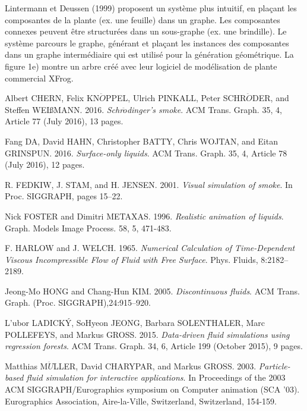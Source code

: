 \documentclass[11pt]{article}
\begin{document}
Lintermann et Deussen (1999) proposent un système plus intuitif, en plaçant les composantes de la plante (ex. une feuille) dans un graphe. Les composantes connexes peuvent être structurées dans un sous-graphe (ex. une brindille). Le système parcours le graphe, générant et plaçant les instances des composantes dans un graphe intermédiaire qui est utilisé pour la génération géométrique. La figure 1e) montre un arbre créé avec leur logiciel de modélisation de plante commercial XFrog.\newline


\newpage
\begin{thebibliography}{2} 

Albert CHERN, Felix KN$\ddot{O}$PPEL, Ulrich PINKALL, Peter SCHR$\ddot{O}$DER, and Steffen WEIßMANN. 2016.
\textit{Schr$\ddot{o}$dinger's smoke}.
 ACM Trans. Graph. 35, 4, Article 77 (July 2016), 13 pages. 

Fang DA, David HAHN, Christopher BATTY, Chris WOJTAN, and Eitan GRINSPUN. 2016.
\textit{Surface-only liquids}.
 ACM Trans. Graph. 35, 4, Article 78 (July 2016), 12 pages.

R. FEDKIW, J. STAM, and H. JENSEN. 2001.
\textit{Visual simulation of smoke}.
In Proc. SIGGRAPH, pages 15–22.

Nick FOSTER and Dimitri METAXAS. 1996.
\textit{Realistic animation of liquids}.
Graph. Models Image Process. 58, 5, 471-483.

F. HARLOW and J. WELCH. 1965.
\textit{Numerical Calculation of Time-Dependent Viscous Incompressible Flow of Fluid with Free Surface}.
Phys. Fluids, 8:2182–2189.

Jeong-Mo HONG and Chang-Hun KIM. 2005.
\textit{Discontinuous fluids}.
ACM Trans. Graph. (Proc. SIGGRAPH),24:915–920.

L'ubor LADICK\'{Y}, SoHyeon JEONG, Barbara SOLENTHALER, Marc POLLEFEYS, and Markus GROSS. 2015.
\textit{Data-driven fluid simulations using regression forests}.
ACM Trans. Graph. 34, 6, Article 199 (October 2015), 9 pages.

Matthias M$\ddot{U}$LLER, David CHARYPAR, and Markus GROSS. 2003.
\textit{Particle-based fluid simulation for interactive applications}.
In Proceedings of the 2003 ACM SIGGRAPH/Eurographics symposium on Computer animation (SCA '03). Eurographics Association, Aire-la-Ville, Switzerland, Switzerland, 154-159.


\end{thebibliography}
\end{document}
